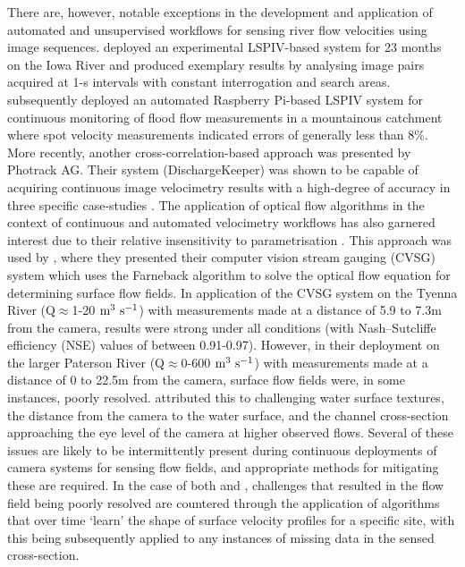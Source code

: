 \documentclass[hess, manuscript]{copernicus} %
\begin{document}
There are, however, notable exceptions in the development and application of automated and unsupervised workflows for sensing river flow velocities using image sequences. \citet{Hauet2008} deployed an experimental LSPIV-based system for 23 months on the Iowa River and produced exemplary results by analysing image pairs acquired at 1-s intervals with constant interrogation and search areas. \citet{Ran2016} subsequently deployed an automated Raspberry Pi-based LSPIV system for continuous monitoring of flood flow measurements in a mountainous catchment where spot velocity measurements indicated errors of generally less than 8\%. More recently, another cross-correlation-based approach was presented by Photrack AG. Their system (DischargeKeeper) was shown to be capable of acquiring continuous image velocimetry results with a high-degree of accuracy in three specific case-studies \citep{Haro2021}. The application of optical flow algorithms in the context of continuous and automated velocimetry workflows has also garnered interest due to their relative insensitivity to parametrisation \citep[e.g.,][]{Pearce2020, Tosi2020}. This approach was used by \citet{Hutley2023}, where they presented their computer vision stream gauging (CVSG) system which uses the Farneback algorithm to solve the optical flow equation for determining surface flow fields. In application of the CVSG system on the Tyenna River (Q$\approx$1-20 $\textnormal{m\textsuperscript{3} s\textsuperscript{-1}}$) with measurements made at a distance of 5.9 to 7.3m from the camera, results were strong under all conditions (with Nash–Sutcliffe efficiency (NSE) values of between 0.91-0.97). However, in their deployment on the larger Paterson River (Q$\approx$0-600 $\textnormal{m\textsuperscript{3} s\textsuperscript{-1}}$) with measurements made at a distance of 0 to 22.5m from the camera, surface flow fields were, in some instances, poorly resolved. \citet{Hutley2023} attributed this to challenging water surface textures, the distance from the camera to the water surface, and the channel cross-section approaching the eye level of the camera at higher observed flows. Several of these issues are likely to be intermittently present during continuous deployments of camera systems for sensing flow fields, and appropriate methods for mitigating these are required. In the case of both \citet{Haro2021} and \citet{Hutley2023}, challenges that resulted in the flow field being poorly resolved are countered through the application of algorithms that over time `learn' the shape of surface velocity profiles for a specific site, with this being subsequently applied to any instances of missing data in the sensed cross-section. 
\end{document}
